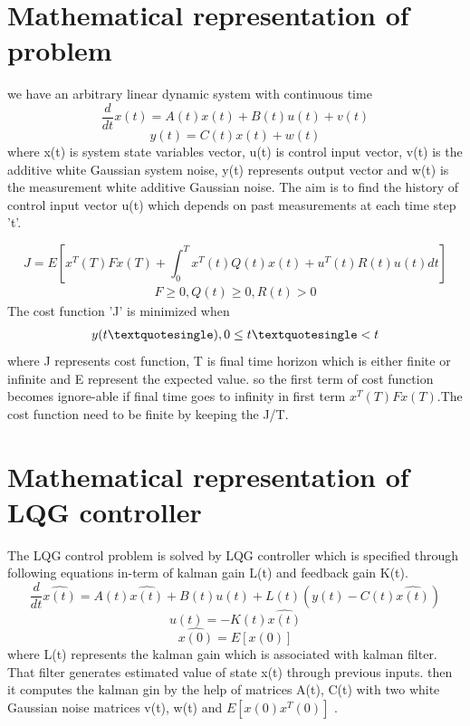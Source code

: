 \documentclass[12pt,a4paper]{article}
\begin{document}
\section*{Mathematical representation of problem}
we have an arbitrary linear dynamic system with continuous time\\
\begin{equation}
\frac{d}{dt}
x(t) = A(t)x(t) + B(t)u(t) + v(t)
\end{equation}
\begin{equation}
y(t) = C(t)x(t) + w(t)
\end{equation}
where x(t) is system state variables vector, u(t) is control input vector, v(t) is the additive white Gaussian system noise, y(t) represents output vector and w(t) is the measurement white additive Gaussian noise. The aim is to find the history of control input vector u(t) which depends on past measurements at each time step 't'.\cite{bernstein1986optimal}

\begin{equation}
J = E[x^T (T) Fx (T)+\int_{0}^{T}{x^T(t)}Q(t)x(t) + u^T(t)R(t)u(t) dt]
\end{equation}
\begin{align*}
F\geq0, Q(t)\geq0, R(t)>0
\end{align*}
The cost function 'J' is minimized when\
\begin{align*}
y(t\textquotesingle), 0\leq t\textquotesingle<t
\end{align*}
where J represents cost function, T is final time horizon which is either finite or infinite and E represent the expected value. so the first term of cost function becomes ignore-able if final time  goes to infinity in first term $x^T (T) Fx (T)$.The cost function need to be finite by keeping the J/T.\cite{bernstein1986optimal}
\section*{Mathematical representation of LQG controller}
The LQG control problem is solved by LQG controller which is specified through following equations in-term of kalman gain L(t) and feedback gain K(t).
\begin{equation}
\frac{d}{dt}
\hat{x(t)} = A(t)\hat{x(t)} + B(t)u(t) + L(t)(y(t)-C(t) \hat{x(t)})
\end{equation}
\begin{equation}
u(t) = -K(t)\hat{x(t)}
\end{equation}
\begin{equation}
\hat{x(0)} = E[x(0)]
\end{equation}
where L(t) represents the kalman gain which is associated with kalman filter. That filter generates estimated value of state x(t) through previous inputs. then it computes the kalman gin by the help of matrices A(t), C(t) with two white Gaussian noise matrices v(t), w(t) and $E[x(0)x^T(0)]$  \cite{bernstein1986optimal} \cite{sharp2011vehicle} .\\
\end{document}
